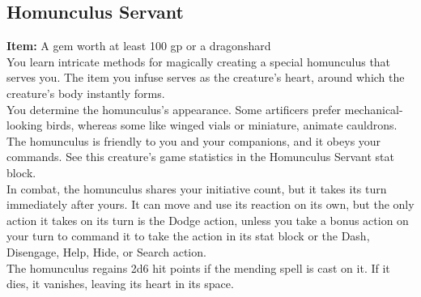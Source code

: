 \documentclass[11pt, A4paper, english]{article}
\begin{document}
		\subsection{Homunculus Servant}
\textbf{Item:} A gem worth at least 100 gp or a dragonshard \\
You learn intricate methods for magically creating a special homunculus that serves you. The item you infuse serves as the creature's heart, around which the creature's body instantly forms. \\
You determine the homunculus's appearance. Some artificers prefer mechanical-looking birds, whereas some like winged vials or miniature, animate cauldrons. \\
The homunculus is friendly to you and your companions, and it obeys your commands. See this creature's game statistics in the Homunculus Servant stat block. \\
In combat, the homunculus shares your initiative count, but it takes its turn immediately after yours. It can move and use its reaction on its own, but the only action it takes on its turn is the Dodge action, unless you take a bonus action on your turn to command it to take the action in its stat block or the Dash, Disengage, Help, Hide, or Search action. \\
The homunculus regains 2d6 hit points if the mending spell is cast on it. If it dies, it vanishes, leaving its heart in its space. \\
\end{document}
